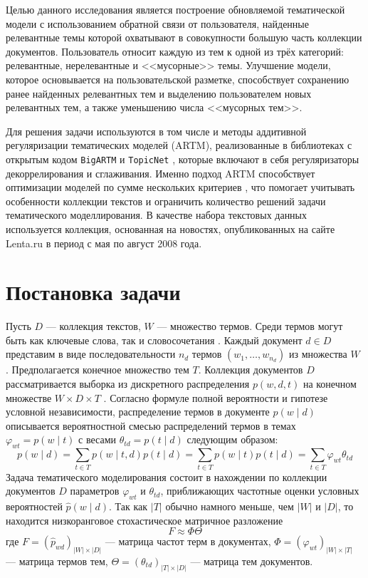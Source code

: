 \documentclass{article}
\begin{document}
Целью данного исследования является построение обновляемой тематической модели с использованием обратной связи от пользователя, найденные релевантные темы которой охватывают в совокупности большую часть коллекции документов.
Пользователь относит каждую из тем к одной из трёх категорий: релевантные, нерелевантные и <<мусорные>> темы. Улучшение модели, которое основывается на пользовательской разметке, способствует сохранению ранее найденных релевантных тем и выделению пользователем новых релевантных тем, а также уменьшению числа <<мусорных тем>>.

Для решения задачи используются в том числе и методы аддитивной регуляризации тематических моделей (ARTM), реализованные в библиотеках с открытым кодом \texttt{BigARTM} и \texttt{TopicNet} \citep{bulatov-etal-2020-topicnet}, которые включают в себя регуляризаторы декоррелирования и сглаживания. Именно подход ARTM способствует оптимизации моделей по сумме нескольких критериев \citep{artm}, что помогает учитывать особенности коллекции текстов и ограничить количество решений задачи тематического моделлирования. В качестве набора текстовых данных используется коллекция, основанная на новостях, опубликованных на сайте Lenta.ru в период с мая по август $2008$ года.

\section{Постановка задачи}

Пусть $D$ — коллекция текстов, $W$ — множество термов.
Среди термов могут быть как ключевые слова, так и словосочетания \citep{artm2}.
Каждый документ $d \in D$ представим в виде последовательности $n_d$ термов $\left( w_1, \dots, w_{n_d} \right)$ из множества $W$ \citep{artm}.
Предполагается конечное множество тем $T$.
Коллекция документов $D$ рассматривается выборка из дискретного распределения $p(w, d, t)$ на конечном множестве $W \times D \times T$ \citep{artm2}.
 Согласно формуле полной вероятности и гипотезе условной независимости, распределение термов в документе $p(w \mid d)$ описывается вероятностной смесью распределений термов в темах $\varphi_{wt} = p(w \mid t)$ с весами $\theta_{td} = p (t \mid d)$ следующим образом: \citep{bigartm}
 \begin{equation}
      p(w \mid d) = \sum \limits_{t \in T} p(w \mid t, d) p(t \mid d) = \sum \limits_{t \in T} p (w \mid t) p (t \mid d) = \sum \limits_{t \in T} \varphi_{wt} \theta_{td}
 \end{equation}
 Задача тематического моделирования состоит в нахождении по коллекции документов $D$ параметров $\varphi_{wt}$ и $\theta_{td}$, приближающих частотные оценки условных вероятностей $\widehat{p} (w \mid d)$.
 Так как $|T|$ обычно намного меньше, чем $|W|$ и $|D|$, то находится низкоранговое стохастическое матричное разложение \citep{artm2}
 \begin{equation}
     F \approx \Phi \Theta
 \end{equation}
 где $F = {(\widehat{p}_{wd})}_{|W| \times |D|}$ — матрица частот терм в документах, $\Phi = {(\varphi_{wt})}_{|W| \times |T|}$ — матрица термов тем, $\Theta = {(\theta_{td})}_{|T| \times |D|}$ — матрица тем документов.
\end{document}
